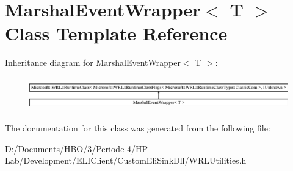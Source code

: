 \hypertarget{class_marshal_event_wrapper}{}\section{Marshal\+Event\+Wrapper$<$ T $>$ Class Template Reference}
\label{class_marshal_event_wrapper}
Inheritance diagram for Marshal\+Event\+Wrapper$<$ T $>$\+:\begin{figure}[H]
\begin{center}
\leavevmode
\includegraphics[height=1.473684cm]{df/dff/class_marshal_event_wrapper}
\end{center}
\end{figure}


The documentation for this class was generated from the following file\+:\begin{DoxyCompactItemize}
\item 
D\+:/\+Documents/\+H\+B\+O/3/\+Periode 4/\+H\+P-\/\+Lab/\+Development/\+E\+L\+I\+Client/\+Custom\+Eli\+Sink\+Dll/W\+R\+L\+Utilities.\+h\end{DoxyCompactItemize}
